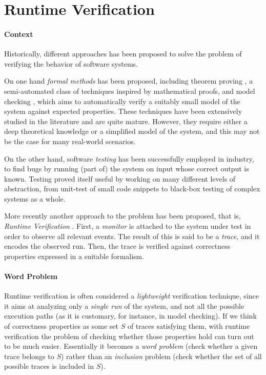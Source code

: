\section{Runtime Verification}
\label{sec:rv}
\paragraph{Context}
Historically, different approaches has been proposed to solve the problem of verifying the behavior of software systems.

On one hand \emph{formal methods} has been proposed, including theorem proving \cite{itp}, a semi-automated class of techniques inspired by mathematical proofs, and model checking \cite{modelchecking}, which aims to automatically verify a suitably small model of the system against expected properties.
These techniques have been extensively studied in the literature and are quite mature.
However, they require either a deep theoretical knowledge or a simplified model of the system, and this may not be the case for many real-world scenarios.

On the other hand, software \emph{testing} \cite{testing} has been successfully employed in industry, to find bugs by running (part of) the system on input whose correct output is known.
Testing proved itself useful by working on many different levels of abstraction, from unit-test of small code snippets to black-box testing of complex systems as a whole.

More recently another approach to the problem has been proposed, that is, \emph{Runtime Verification} \cite{rv}.
First, a \emph{monitor} is attached to the system under test in order to observe all relevant events.
The result of this is said to be a \emph{trace}, and it encodes the observed run.
Then, the trace is verified against correctness properties expressed in a suitable formalism.

\paragraph{Word Problem}
Runtime verification is often considered a \emph{lightweight} verification technique, since it aims at analyzing only a \emph{single run} of the system, and not all the possible execution paths (as it is customary, for instance, in model checking).
If we think of correctness properties as some set \(S\) of traces satisfying them, with runtime verification the problem of checking whether those properties hold can turn out to be much easier.
Essentially it becomes a \emph{word problem} (check whether a given trace belongs to \(S\)) rather than an \emph{inclusion} problem (check whether the set of all possible traces is included in \(S\)).

